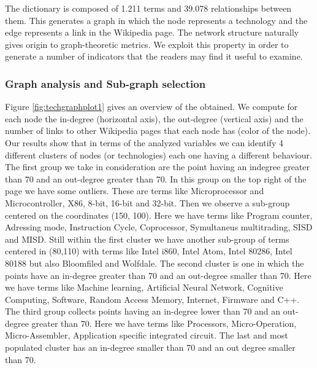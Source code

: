 \documentclass[]{book}
\begin{document}
The dictionary is composed of 1.211 terms and 39.078 relationships
between them. This generates a graph in which the node represents a
technology and the edge represents a link in the Wikipedia page. The
network structure naturally gives origin to graph-theoretic metrics. We
exploit this property in order to generate a number of indicators that
the readers may find it useful to examine.

\subsubsection*{Graph analysis and Sub-graph
selection}\label{graph-analysis-and-sub-graph-selection}

Figure \ref{fig:techgraphplot1} gives an overview of the obtained. We
compute for each node the in-degree (horizontal axis), the out-degree
(vertical axis) and the number of links to other Wikipedia pages that
each node has (color of the node). Our results show that in terms of the
analyzed variables we can identify 4 different clusters of nodes (or
technologies) each one having a different behaviour. The first group we
take in consideration are the point having an indegree greater than 70
and an out-degree greater than 70. In this group on the top right of the
page we have some outliers. These are terms like Microprocessor and
Microcontroller, X86, 8-bit, 16-bit and 32-bit. Then we observe a
sub-group centered on the coordinates (150, 100). Here we have terms
like Program counter, Adressing mode, Instruction Cycle, Coprocessor,
Symultaneus multitrading, SISD and MISD. Still within the first cluster
we have another sub-group of terms centered in (80,110) with terms like
Intel i860, Intel Atom, Intel 80286, Intel 80188 but also Bloomfiled and
Wolfdale. The second cluster is one in which the points have an
in-degree greater than 70 and an out-degree smaller than 70. Here we
have terms like Machine learning, Artificial Neural Network, Cognitive
Computing, Software, Random Access Memory, Internet, Firmware and C++.
The third group collects points having an in-degree lower than 70 and an
out-degree greater than 70. Here we have terms like Processors,
Micro-Operation, Micro-Assembler, Application specific integrated
circuit. The last and most populated cluster has an in-degree smaller
than 70 and an out degree smaller than 70.
\end{document}
